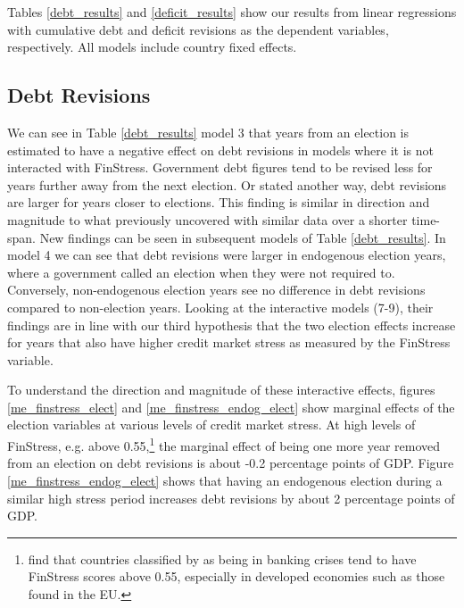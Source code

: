 \documentclass[]{article}
\begin{document}
Tables \ref{debt_results} and \ref{deficit_results} show our results from linear regressions with cumulative debt and deficit revisions as the dependent variables, respectively. All models include country fixed effects.

\subsection{Debt Revisions}

We can see in Table \ref{debt_results} model 3 that years from an election is estimated to have a negative effect on debt revisions in models where it is not interacted with FinStress. Government debt figures tend to be revised less for years further away from the next election. Or stated another way, debt revisions are larger for years closer to elections. This finding is similar in direction and magnitude to what \cite{DeCastro2013} previously uncovered with similar data over a shorter time-span. New findings can be seen in subsequent models of Table \ref{debt_results}. In model 4 we can see that debt revisions were larger in endogenous election years, where a government called an election when they were not required to. Conversely, non-endogenous election years see no difference in debt revisions compared to non-election years. Looking at the interactive models (7-9), their findings are in line with our third hypothesis that the two election effects increase for years that also have higher credit market stress as measured by the FinStress variable.

To understand the direction and magnitude of these interactive effects, figures \ref{me_finstress_elect} and \ref{me_finstress_endog_elect} show marginal effects of the election variables at various levels of credit market stress. At high levels of FinStress, e.g. above 0.55,\footnote{\cite{finstress_paper} find that countries classified by \cite{Laeven2012} as being in banking crises tend to have FinStress scores above 0.55, especially in developed economies such as those found in the EU.} the marginal effect of being one more year removed from an election on debt revisions is about -0.2 percentage points of GDP. Figure \ref{me_finstress_endog_elect} shows that having an endogenous election during a similar high stress period increases debt revisions by about 2 percentage points of GDP.
\end{document}
